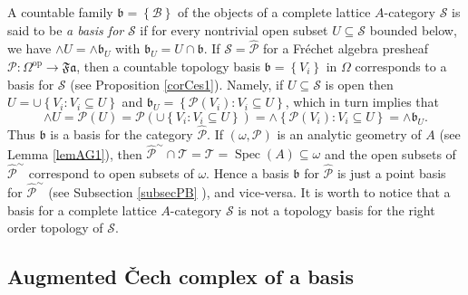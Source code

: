 \documentclass[12pt]{amsart}%
\theoremstyle{plain}
\numberwithin{equation}{section}
\numberwithin{equation}{section}
\numberwithin{theorem}{section}
\numberwithin{lemma}{section}
\numberwithin{remark}{section}
\numberwithin{example}{section}
\numberwithin{proposition}{section}
\numberwithin{definition}{section}
\numberwithin{corollary}{section}
\begin{document}
A countable family $\mathfrak{b=}\left\{  \mathcal{B}\right\}  $ of the
objects of a complete lattice $A$-category $\mathcal{S}$ is said to be
\textit{a basis for }$\mathcal{S}$ if for every nontrivial open subset
$U\subseteq\mathcal{S}$ bounded below, we have $\wedge U=\wedge\mathfrak{b}%
_{U}$ with $\mathfrak{b}_{U}=U\cap\mathfrak{b}$. If $\mathcal{S}%
=\widehat{\mathcal{P}}$ for a Fr\'{e}chet algebra presheaf $\mathcal{P}%
:\Omega^{\operatorname{op}}\rightarrow\mathfrak{Fa}$, then a countable
topology basis $\mathfrak{b=}\left\{  V_{i}\right\}  $ in $\Omega$ corresponds
to a basis for $\mathcal{S}$ (see Proposition \ref{corCes1}). Namely, if
$U\subseteq\mathcal{S}$ is open then $U=\cup\left\{  V_{i}:V_{i}\subseteq
U\right\}  $ and $\mathfrak{b}_{U}=\left\{  \mathcal{P}\left(  V_{i}\right)
:V_{i}\subseteq U\right\}  $, which in turn implies that%
\[
\wedge U=\mathcal{P}\left(  U\right)  =\mathcal{P}\left(  \cup\left\{
V_{i}:V_{i}\subseteq U\right\}  \right)  =\wedge\left\{  \mathcal{P}\left(
V_{i}\right)  :V_{i}\subseteq U\right\}  =\wedge\mathfrak{b}_{U}.
\]
Thus $\mathfrak{b}$ is a basis for the category $\widehat{\mathcal{P}}$. If
$\left(  \omega,\mathcal{P}\right)  $ is an analytic geometry of $A$ (see
Lemma \ref{lemAG1}), then $\widehat{\mathcal{P}}^{\sim}\cap\mathcal{T}%
=\mathcal{T}=\operatorname{Spec}\left(  A\right)  \subseteq\omega$ and the
open subsets of $\widehat{\mathcal{P}}^{\sim}$ correspond to open subsets of
$\omega$. Hence a basis $\mathfrak{b}$ for $\widehat{\mathcal{P}}$ is just a
point basis for $\widehat{\mathcal{P}}^{\sim}$ (see Subsection \ref{subsecPB}%
), and vice-versa. It is worth to notice that a basis for a complete lattice
$A$-category $\mathcal{S}$ is not a topology basis for the right order
topology of $\mathcal{S}$.

\subsection{Augmented \v{C}ech complex of a basis}
\end{document}
